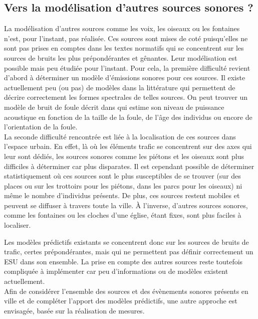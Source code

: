 \subsection{Vers la modélisation d'autres sources sonores ?}

La modélisation d'autres sources comme les voix, les oiseaux ou les fontaines n'est, pour l'instant, pas réalisée. 
Ces sources sont mises de coté puisqu'elles ne sont pas prises en comptes dans les textes normatifs qui se concentrent sur les sources de bruits les plus prépondérantes et gênantes. Leur modélisation est possible mais peu étudiée pour l'instant. Pour cela, la première difficulté revient d'abord à déterminer un modèle d'émissions sonores pour ces sources. Il existe actuellement peu (ou pas) de modèles dans la littérature qui permettent de décrire correctement les formes spectrales de telles sources. On peut trouver un modèle de bruit de foule décrit dans \cite{hayne2011prediction} qui estime son niveau de puissance acoustique en fonction de la taille de la foule, de l'âge des individus ou encore de l'orientation de la foule. \\

La seconde difficulté rencontrée est liée à la localisation de ces sources dans l'espace urbain. En effet, là où les éléments trafic se concentrent sur des axes qui leur sont dédiés, les sources sonores comme les piétons et les oiseaux sont plus difficiles à déterminer car plus disparates. Il est cependant possible de déterminer statistiquement où ces sources sont le plus susceptibles de se trouver (sur des places ou sur les trottoirs pour les piétons, dans les parcs pour les oiseaux) ni même le nombre d'individus présents. De plus, ces sources restent mobiles et peuvent se diffuser à travers toute la ville. À l'inverse, d'autres sources sonores, comme les fontaines ou les cloches d'une église, étant fixes, sont plus faciles à localiser. 

Les modèles prédictifs existants se concentrent donc sur les sources de bruits de trafic, certes prépondérantes, mais qui ne permettent pas définir correctement un ESU dans son ensemble. La prise en compte des autres sources reste toutefois compliquée à implémenter car peu d'informations ou de modèles existent actuellement. \\

Afin de considérer l'ensemble des sources et des évènements sonores présents en ville et de compléter l'apport des modèles prédictifs, une autre approche est envisagée, basée sur la réalisation de mesures. 

